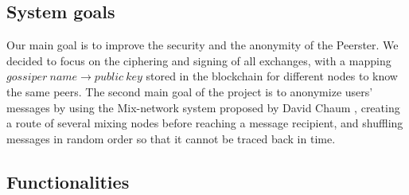 \documentclass[11pt, a4paper]{article}
\begin{document}
    \subsection{System goals}\label{subsec:system-goals}

        Our main goal is to improve the security and the anonymity of the Peerster.
        We decided to focus on the ciphering and signing of all exchanges, with a mapping $gossiper~name \rightarrow public~key$ stored in the blockchain for different nodes to know the same peers.
        The second main goal of the project is to anonymize users' messages by using the Mix-network system proposed by David Chaum \cite{chaum84}, creating a route of several mixing nodes before reaching a message recipient, and shuffling messages in random order so that it cannot be traced back in time.

    \subsection{Functionalities}\label{subsec:functionalities}
\end{document}
